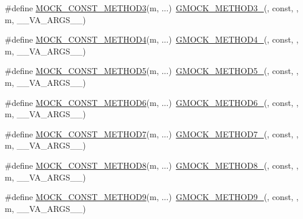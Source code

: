 \begin{DoxyCompactItemize}
\item 
\#define \mbox{\hyperlink{gmock-generated-function-mockers_8h_a9e67763df6705172e1a2ae92f1446bbc}{M\+O\+C\+K\+\_\+\+C\+O\+N\+S\+T\+\_\+\+M\+E\+T\+H\+O\+D3}}(m, ...)~\mbox{\hyperlink{gmock-generated-function-mockers_8h_af7c77ba511c631de02bb8c45a6ed3045}{G\+M\+O\+C\+K\+\_\+\+M\+E\+T\+H\+O\+D3\+\_\+}}(, const, , m, \+\_\+\+\_\+\+V\+A\+\_\+\+A\+R\+G\+S\+\_\+\+\_\+)
\item 
\#define \mbox{\hyperlink{gmock-generated-function-mockers_8h_a4614e9d6b24dff60c30dd4dedf494c6c}{M\+O\+C\+K\+\_\+\+C\+O\+N\+S\+T\+\_\+\+M\+E\+T\+H\+O\+D4}}(m, ...)~\mbox{\hyperlink{gmock-generated-function-mockers_8h_ab6430f2cfad9de4aca5258ea559294bb}{G\+M\+O\+C\+K\+\_\+\+M\+E\+T\+H\+O\+D4\+\_\+}}(, const, , m, \+\_\+\+\_\+\+V\+A\+\_\+\+A\+R\+G\+S\+\_\+\+\_\+)
\item 
\#define \mbox{\hyperlink{gmock-generated-function-mockers_8h_ab7021ec2b869e7c9ea90363ee675f19b}{M\+O\+C\+K\+\_\+\+C\+O\+N\+S\+T\+\_\+\+M\+E\+T\+H\+O\+D5}}(m, ...)~\mbox{\hyperlink{gmock-generated-function-mockers_8h_a9e3ecd392499ab19a4a6d3adcabf56f6}{G\+M\+O\+C\+K\+\_\+\+M\+E\+T\+H\+O\+D5\+\_\+}}(, const, , m, \+\_\+\+\_\+\+V\+A\+\_\+\+A\+R\+G\+S\+\_\+\+\_\+)
\item 
\#define \mbox{\hyperlink{gmock-generated-function-mockers_8h_a5081a185ba264d599357398952c23af1}{M\+O\+C\+K\+\_\+\+C\+O\+N\+S\+T\+\_\+\+M\+E\+T\+H\+O\+D6}}(m, ...)~\mbox{\hyperlink{gmock-generated-function-mockers_8h_ad0ca7f6973a076d0af4c953f8ed91842}{G\+M\+O\+C\+K\+\_\+\+M\+E\+T\+H\+O\+D6\+\_\+}}(, const, , m, \+\_\+\+\_\+\+V\+A\+\_\+\+A\+R\+G\+S\+\_\+\+\_\+)
\item 
\#define \mbox{\hyperlink{gmock-generated-function-mockers_8h_a0f0e63ed14beab1d85f0160bdbed9930}{M\+O\+C\+K\+\_\+\+C\+O\+N\+S\+T\+\_\+\+M\+E\+T\+H\+O\+D7}}(m, ...)~\mbox{\hyperlink{gmock-generated-function-mockers_8h_ab98a8399ba62b53b375c2807f4d39d2f}{G\+M\+O\+C\+K\+\_\+\+M\+E\+T\+H\+O\+D7\+\_\+}}(, const, , m, \+\_\+\+\_\+\+V\+A\+\_\+\+A\+R\+G\+S\+\_\+\+\_\+)
\item 
\#define \mbox{\hyperlink{gmock-generated-function-mockers_8h_a614ee58b7c9ab72e90c850d4bb97a502}{M\+O\+C\+K\+\_\+\+C\+O\+N\+S\+T\+\_\+\+M\+E\+T\+H\+O\+D8}}(m, ...)~\mbox{\hyperlink{gmock-generated-function-mockers_8h_aa84a36427c44505207b7cad5dec7ad67}{G\+M\+O\+C\+K\+\_\+\+M\+E\+T\+H\+O\+D8\+\_\+}}(, const, , m, \+\_\+\+\_\+\+V\+A\+\_\+\+A\+R\+G\+S\+\_\+\+\_\+)
\item 
\#define \mbox{\hyperlink{gmock-generated-function-mockers_8h_ab7429646bacf56a7d560a3d81d497880}{M\+O\+C\+K\+\_\+\+C\+O\+N\+S\+T\+\_\+\+M\+E\+T\+H\+O\+D9}}(m, ...)~\mbox{\hyperlink{gmock-generated-function-mockers_8h_aa820171a19cc587c247dbe05cbffc55f}{G\+M\+O\+C\+K\+\_\+\+M\+E\+T\+H\+O\+D9\+\_\+}}(, const, , m, \+\_\+\+\_\+\+V\+A\+\_\+\+A\+R\+G\+S\+\_\+\+\_\+)

\end{DoxyCompactItemize}
